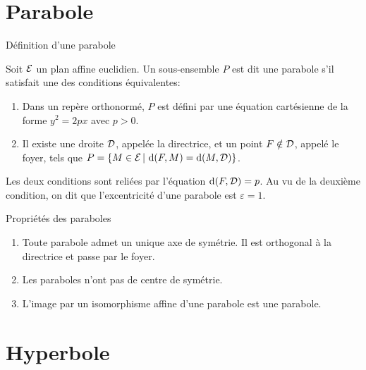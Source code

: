 \documentclass[11pt]{m53beamer}
\begin{document}
\section{Parabole}

\begin{frame}{Définition d'une parabole}
  \begin{defprop}
    Soit $\mathcal{E}$ un plan affine euclidien. Un sous-ensemble $P$ est dit une \alert{parabole} s'il satisfait une des conditions équivalentes:
    \begin{enumerate}[<+(1)->]
      \item Dans un repère orthonormé, $P$ est défini par une équation cartésienne de la forme $y^{2}=2px$ avec $p>0$.
      \item Il existe une droite $\mathcal{D}$, appelée \alert{la directrice}, et un point $F \notin \mathcal{D}$, appelé le \alert{foyer}, tels que $P = \{ M \in \mathcal{E} \,|\, \operatorname{d}(F,M)=\operatorname{d}(M,\mathcal{D})\}$.
    \end{enumerate}
  \end{defprop}\pause
  Les deux conditions sont reliées par l'équation $\operatorname{d}(F,\mathcal{D})=p$.\pause{}\newline
  Au vu de la deuxième condition, on dit que l'excentricité d'une parabole est $\varepsilon=1$.
\end{frame}
\begin{frame}{Propriétés des paraboles}
  \begin{enumerate}[<+(1)->]
    \item Toute parabole admet un unique axe de symétrie. Il est orthogonal à la directrice et passe par le foyer.
    \item Les paraboles n'ont pas de centre de symétrie.
    \item L'image par un isomorphisme affine d'une parabole est une parabole.
  \end{enumerate}
\end{frame}

\section{Hyperbole}
\end{document}
